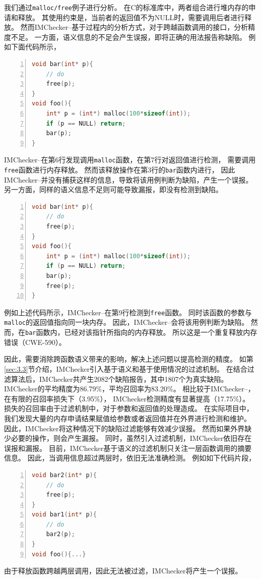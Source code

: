 我们通过\texttt{malloc/free}例子进行分析。
在C的标准库中，两者组合进行堆内存的申请和释放。
其使用约束是，当前者的返回值不为NULL时，需要调用后者进行释放。
然而IMChecker--基于过程内的分析方式，对于跨越函数调用的接口，分析精度不足。
一方面，语义信息的不足会产生误报，即将正确的用法报告称缺陷。
例如下面代码所示，
\begin{lstlisting}[language={C},
basicstyle=\linespread{0.7}\listingsfont,
numbers=left,
xleftmargin=.3\textwidth]
void bar(int* p){
	// do
	free(p);
}
void foo(){
	int* p = (int*) malloc(100*sizeof(int));
	if (p == NULL) return;
	bar(p);
}
\end{lstlisting}
IMChecker--在第6行发现调用\texttt{malloc}函数，在第7行对返回值进行检测，
需要调用\texttt{free}函数进行内存释放。
然而该释放操作在第3行的\texttt{bar}函数内进行，
因此IMChecker--并没有捕获这样的信息，导致将该用例判断为缺陷，产生一个误报。
另一方面，同样的语义信息不足则可能导致漏报，即没有检测到缺陷。
\begin{lstlisting}[language={C},
basicstyle=\linespread{0.7}\listingsfont,
numbers=left,
xleftmargin=.3\textwidth]
void bar(int* p){
	// do
	free(p);
}
void foo(){
	int* p = (int*) malloc(100*sizeof(int));
	if (p == NULL) return;
	bar(p);
	free(p);
}
\end{lstlisting}
例如上述代码所示，IMChecker--在第9行检测到\texttt{free}函数。
同时该函数的参数与\texttt{malloc}的返回值指向同一块内存。
因此，IMChecker--会将该用例判断为缺陷。
然而，在\texttt{bar}函数内，已经对该指针所指向的内存释放。
所以这是一个重复释放内存错误（CWE-590）。

因此，需要消除跨函数语义带来的影响，解决上述问题以提高检测的精度。
如第\ref{sec:3.3}节介绍，IMChecker引入基于语义和基于使用情况的过滤机制。
在结合过滤算法后，IMChecker共产生2082个缺陷报告，其中1807个为真实缺陷。
IMChecker的平均精度为86.79\%，平均召回率为83.20\%。
相比较于IMChecker--，在有限的召回率损失下（3.95\%），
IMChecker检测精度有显著提高（17.75\%）。
损失的召回率由于过滤机制中，对于参数和返回值的处理造成。
在实际项目中，我们发现大量的内存申请结果赋值给参数或者返回值并在外界进行检测和维护。
因此，IMChecker将这种情况下的缺陷过滤能够有效减少误报。
然而如果外界缺少必要的操作，则会产生漏报。
同时，虽然引入过滤机制，IMChecker依旧存在误报和漏报。
目前，IMChecker基于语义的过滤机制只关注一层函数调用的摘要信息。
因此，当调用信息超过两层时，依旧无法准确检测。
例如如下代码片段，
\begin{lstlisting}[language={C},
basicstyle=\linespread{0.7}\listingsfont,
numbers=left,
xleftmargin=.35\textwidth]
void bar2(int* p){        
	// do						   
	free(p);					  
}
void bar1(int* p){        
	// do						   
	bar2(p);					  
}
void foo(){...}
\end{lstlisting}
由于释放函数跨越两层调用，因此无法被过滤，IMChecker将产生一个误报。


